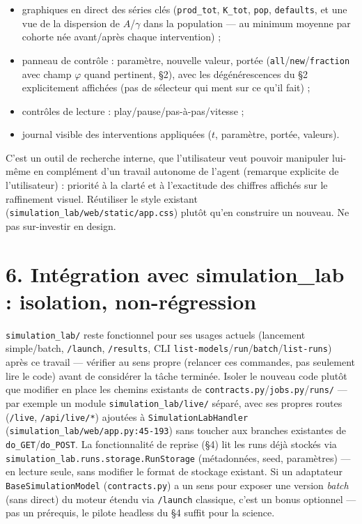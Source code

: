 \documentclass[11pt,a4paper]{article}
\newcommand{\code}[1]{\texttt{#1}}
\begin{document}
\begin{itemize}
\item graphiques en direct des séries clés (\code{prod\_tot},
  \code{K\_tot}, \code{pop}, \code{defaults}, et une vue de la dispersion
  de $A$/$\gamma$ dans la population --- au minimum moyenne par cohorte
  née avant/après chaque intervention) ;
\item panneau de contrôle : paramètre, nouvelle valeur, portée
  (\code{all}/\code{new}/\code{fraction} avec champ $\varphi$ quand
  pertinent, \S2), avec les dégénérescences du \S2 explicitement
  affichées (pas de sélecteur qui ment sur ce qu'il fait) ;
\item contrôles de lecture : play/pause/pas-à-pas/vitesse ;
\item journal visible des interventions appliquées ($t$, paramètre,
  portée, valeurs).
\end{itemize}

C'est un outil de recherche interne, que l'utilisateur veut pouvoir
manipuler lui-même en complément d'un travail autonome de l'agent
(remarque explicite de l'utilisateur) : priorité à la clarté et à
l'exactitude des chiffres affichés sur le raffinement visuel. Réutiliser
le style existant (\code{simulation\_lab/web/static/app.css}) plutôt
qu'en construire un nouveau. Ne pas sur-investir en design.

\section*{6. Intégration avec simulation\_lab : isolation, non-régression}

\code{simulation\_lab/} reste fonctionnel pour ses usages actuels
(lancement simple/batch, \code{/launch}, \code{/results}, CLI
\code{list-models}/\code{run}/\code{batch}/\code{list-runs}) après ce
travail --- vérifier au sens propre (relancer ces commandes, pas
seulement lire le code) avant de considérer la tâche terminée. Isoler le
nouveau code plutôt que modifier en place les chemins existants de
\code{contracts.py}/\code{jobs.py}/\code{runs/} --- par exemple un
module \code{simulation\_lab/live/} séparé, avec ses propres routes
(\code{/live}, \code{/api/live/*}) ajoutées à
\code{SimulationLabHandler} (\code{simulation\_lab/web/app.py:45-193})
sans toucher aux branches existantes de \code{do\_GET}/\code{do\_POST}.
La fonctionnalité de reprise (\S4) lit les runs déjà stockés via
\code{simulation\_lab.runs.storage.RunStorage} (métadonnées, seed,
paramètres) --- en lecture seule, sans modifier le format de stockage
existant. Si un adaptateur \code{BaseSimulationModel} (\code{contracts.py})
a un sens pour exposer une version \emph{batch} (sans direct) du moteur
étendu via \code{/launch} classique, c'est un bonus optionnel --- pas un
prérequis, le pilote headless du \S4 suffit pour la science.
\end{document}

